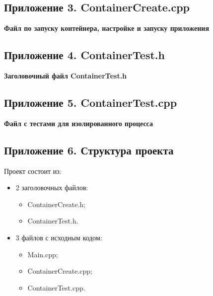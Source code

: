 \subsection*{Приложение 3. ContainerCreate.cpp} \label{p1:1}
\textbf{Файл по запуску контейнера, настройке и запуску приложения}

\subsection*{Приложение 4. ContainerTest.h} \label{p1:1}
\textbf{Заголовочный файл ContainerTest.h}

\subsection*{Приложение 5. ContainerTest.cpp} \label{p1:1}
\textbf{Файл с тестами для изолированного процесса}

\subsection*{Приложение 6. Структура проекта} \label{p1:1}
Проект состоит из:
\begin{itemize}
\item 2 заголовочных файлов:
\begin{itemize}
\item ContainerCreate.h;
\item ContainerTest.h.
\end{itemize}
\item 3 файлов с исходным кодом:
\begin{itemize}
\item Main.cpp;
\item ContainerCreate.cpp;
\item ContainerTest.cpp.
\end{itemize}
\end{itemize}



